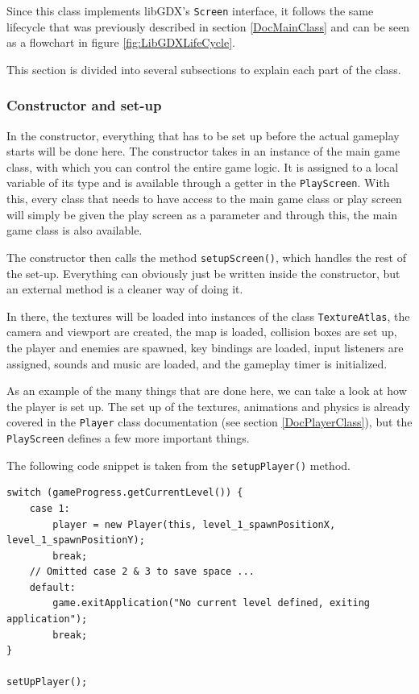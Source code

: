 \documentclass[12p]{article}
\begin{document}
Since this class implements libGDX's \texttt{Screen} interface, it follows the same lifecycle that was previously described in section \ref{DocMainClass} and can be seen as a flowchart in figure \ref{fig:LibGDXLifeCycle}. 

This section is divided into several subsections to explain each part of the class.
 
\subsubsection{Constructor and set-up}

In the constructor, everything that has to be set up before the actual gameplay starts will be done here. The constructor takes in an instance of the main game class, with which you can control the entire game logic. It is assigned to a local variable of its type and is available through a getter in the \texttt{PlayScreen}. With this, every class that needs to have access to the main game class or play screen will simply be given the play screen as a parameter and through this, the main game class is also available.

The constructor then calls the method \texttt{setupScreen()}, which handles the rest of the set-up. Everything can obviously just be written inside the constructor, but an external method is a cleaner way of doing it.

In there, the textures will be loaded into instances of the class \texttt{TextureAtlas}, the camera and viewport are created, the map is loaded, collision boxes are set up, the player and enemies are spawned, key bindings are loaded, input listeners are assigned, sounds and music are loaded, and the gameplay timer is initialized.

As an example of the many things that are done here, we can take a look at how the player is set up. The set up of the textures, animations and physics is already covered in the \texttt{Player} class documentation (see section \ref{DocPlayerClass}), but the \texttt{PlayScreen} defines a few more important things.

The following code snippet is taken from the \texttt{setupPlayer()} method.

\begin{verbatim}
switch (gameProgress.getCurrentLevel()) {
    case 1:
        player = new Player(this, level_1_spawnPositionX, level_1_spawnPositionY);
        break;
    // Omitted case 2 & 3 to save space ...
    default:
        game.exitApplication("No current level defined, exiting application");
        break;
}

setUpPlayer();
\end{verbatim}
\end{document}
